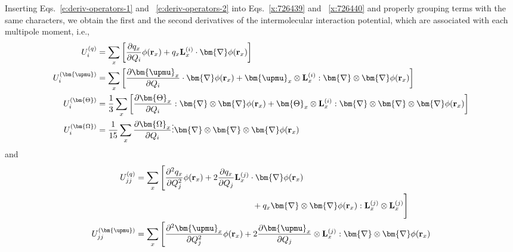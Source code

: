 \documentclass[b5paper,oneside,fleqn,11pt]{book}
\newcommand{\BM}[1]{\bm{#1}}
\newcommand{\fderiv}[2]{\ensuremath{
    \frac{\partial #1}{\partial #2}}}
\newcommand{\sderiv}[2]{\ensuremath{
    \frac{\partial^2 #1}{\partial #2^2}
    }}
\begin{document}
\begin{refsection}
Inserting Eqs.~\eqref{e:deriv-operators-1} and ~\eqref{e:deriv-operators-2}
into Eqs.~\eqref{x:726439} and ~\eqref{x:726440} and properly 
grouping terms with the same characters, we obtain
the first and the second derivatives of the intermolecular interaction
potential, which are associated with each multipole moment, i.e.,
%
\begin{subequations}  \label{e:f-terms}
\begin{align}
 U_i^{(q)}          &= \sum_x 
  \left[ \fderiv{q_x}{Q_i} \phi({\bf r}_x) 
 + q_x {\bf L}_x^{(i)} \cdot {\BM \nabla} \phi({\bf r}_x) \right]       
                                                                \label{e:f-terms-1} \\
 U_i^{(\BM\upmu)}     &= \sum_x  
  \left[ \fderiv{{\BM \upmu}_x}{Q_i} \cdot {\BM \nabla}\phi({\bf r}_x) 
 + {\BM \upmu}_x \otimes {\bf L}_x^{(i)} : {\BM \nabla}\otimes{\BM \nabla} \phi({\bf r}_x) \right]     
                                                                \label{e:f-terms-2} \\
 U_i^{(\BM\Theta)}  &= \frac{1}{3} \sum_x  
  \left[ \fderiv{{\BM \Theta}_x}{Q_i} : {\BM \nabla}\otimes{\BM \nabla}\phi({\bf r}_x) 
 + {\BM \Theta}_x \otimes {\bf L}_x^{(i)} : {\BM \nabla}\otimes{\BM \nabla}\otimes{\BM \nabla} \phi({\bf r}_x) \right]      
                                                                \label{e:f-terms-3} \\
 U_i^{(\BM\Omega)}  &= \frac{1}{15} \sum_x      
  \fderiv{{\BM \Omega}_x}{Q_i} \vdots {\BM \nabla}\otimes{\BM \nabla}\otimes{\BM \nabla}\phi({\bf r}_x)  
                                                                \label{e:f-terms-4} 
\end{align}
\end{subequations}
%
and
%
\begin{subequations}  \label{e:k-terms}
\begin{align}
 U_{jj}^{(q)}          &= \sum_x   
    \Bigg[ \sderiv{q_x}{Q_j} \phi({\bf r}_x) 
    + 2 \fderiv{q_x}{Q_j} {\bf L}_x^{(j)} \cdot {\BM \nabla} \phi({\bf r}_x) \nonumber \\ 
    &\qquad\qquad\qquad\qquad\qquad\qquad\qquad+ q_x {\BM \nabla}\otimes{\BM \nabla} \phi({\bf r}_x) : {\bf L}_x^{(j)} \otimes {\bf L}_x^{(j)} \Bigg]     \label{e:k-terms-1} \\
%
 U_{jj}^{(\BM\upmu)}     &= \sum_x  
    \Bigg[ \sderiv{{\BM \upmu}_x}{Q_j} \phi({\bf r}_x) 
    + 2 \fderiv{{\BM \upmu}_x}{Q_j} \otimes {\bf L}_x^{(j)} : {\BM \nabla}\otimes{\BM \nabla} \phi({\bf r}_x) \nonumber \\

\end{align}
\end{subequations}
\end{refsection}
\end{document}
